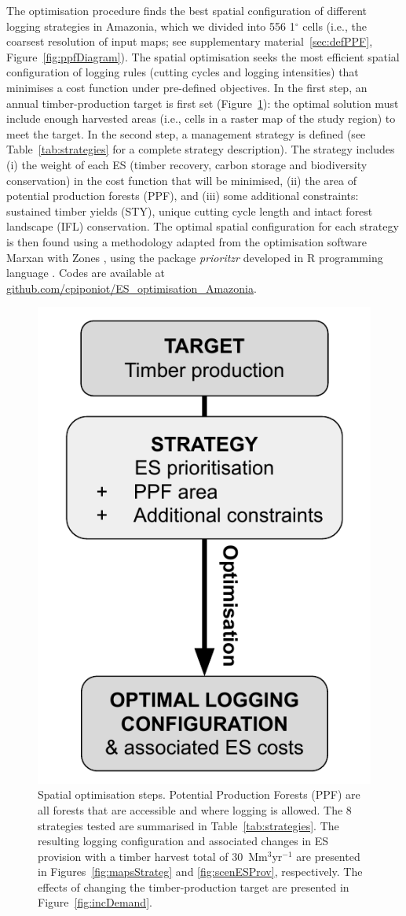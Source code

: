 \documentclass{article}
\begin{document}
The optimisation procedure finds the best spatial configuration of different logging strategies in Amazonia, which we divided into 556 1$^{\circ}$ cells (i.e., the coarsest resolution of input maps; see supplementary material~\ref{sec:defPPF}, Figure~\ref{fig:ppfDiagram}). The spatial optimisation seeks the most efficient spatial configuration of logging rules (cutting cycles and logging intensities) that minimises a cost function under pre-defined objectives. In the first step, an annual timber-production target is first set (Figure~\ref{fig:basicDiagram}): the optimal solution must include enough harvested areas (i.e., cells in a raster map of the study region) to meet the target. In the second step, a management strategy is defined (see Table~\ref{tab:strategies} for a complete strategy description). The strategy includes (i) the weight of each ES (timber recovery, carbon storage and biodiversity conservation) in the cost function that will be minimised, (ii) the area of potential production forests (PPF), and (iii) some additional constraints: sustained timber yields (STY), unique cutting cycle length and intact forest landscape (IFL) conservation. The optimal spatial configuration for each strategy is then found using a methodology adapted from the optimisation software Marxan with Zones \cite{Watts2009}, using the package \textit{prioritzr} \cite{Hanson2018} developed in R programming language \cite{RCoreTeam2017}. Codes are available at \url{github.com/cpiponiot/ES_optimisation_Amazonia}. 

\begin{figure}
    \centering
    \includegraphics[width = 0.6\linewidth]{graphs/diagramSpatOptim}
    \caption{Spatial optimisation steps. Potential Production Forests (PPF) are all forests that are accessible and where logging is allowed. The 8 strategies tested are summarised in Table~\ref{tab:strategies}. The resulting logging configuration and associated changes in ES provision with a timber harvest total of 30~Mm$^3$yr$^{-1}$ are presented in Figures~\ref{fig:mapsStrateg} and \ref{fig:scenESProv}, respectively. The effects of changing the timber-production target are presented in Figure~\ref{fig:incDemand}.}
    \label{fig:basicDiagram}
\end{figure}
\end{document}
